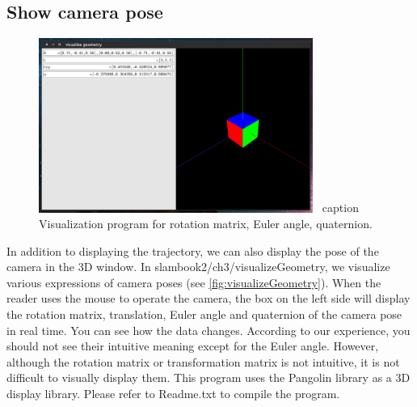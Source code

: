 \subsection {Show camera pose}
\begin{figure}[!htp]
    \centering
    \includegraphics[width=0.8\textwidth]{rigidMotion/visualizeGeometry.pdf}
    \ caption { Visualization program for rotation matrix, Euler angle, quaternion. }
    \label{fig:visualizeGeometry}
\end{figure}

In addition to displaying the trajectory, we can also display the pose of the camera in the 3D window. In slambook2/ch3/visualizeGeometry, we visualize various expressions of camera poses (see \autoref{fig:visualizeGeometry}). When the reader uses the mouse to operate the camera, the box on the left side will display the rotation matrix, translation, Euler angle and quaternion of the camera pose in real time. You can see how the data changes. According to our experience, you should not see their intuitive meaning except for the Euler angle. However, although the rotation matrix or transformation matrix is not intuitive, it is not difficult to visually display them. This program uses the Pangolin library as a 3D display library. Please refer to Readme.txt to compile the program.
